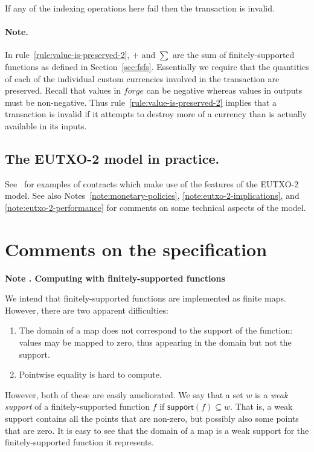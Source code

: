 \documentclass[a4paper]{article}
\newcounter{note}
\newcommand{\note}[1]{
  \bigskip
  \refstepcounter{note}
  \noindent\textbf{Note \thenote. #1}
}
\newcommand{\msf}[1]{\ensuremath{\mathsf{#1}}}
\newcommand{\mi}[1]{\ensuremath{\mathit{#1}}}
\newcommand{\support}{\msf{support}}
\newcommand{\forge}{\mi{forge}}
\begin{document}
\noindent If any of the indexing operations here fail then the
transaction is invalid.

\paragraph{Note.} In rule~\ref{rule:value-is-preserved-2},
$+$ and $\sum$ are the sum of finitely-supported functions as defined in
Section~\ref{sec:fsfs}. Essentially we require that the
quantities of each of the individual custom currencies involved in the
transaction are preserved. Recall that values in $\forge$ can
be negative whereas values in outputs must be non-negative.  Thus
rule~\ref{rule:value-is-preserved-2} implies that a
transaction is invalid if it attempts to destroy more of a currency
than is actually available in its inputs.

\subsection{The EUTXO-2 model in practice.}
See~\cite{Plutus-book} for examples of contracts which make use of the
features of the EUTXO-2 model.  See also
Notes~\ref{note:monetary-policies}, \ref{note:eutxo-2-implications},
and \ref{note:eutxo-2-performance} for comments on some technical
aspects of the model.

\appendix
\section{Comments on the specification}
\label{appendix:comments}

\note{Computing with finitely-supported functions}
\label{note:finitely-supported-functions}

We intend that finitely-supported functions are implemented as finite
maps. However, there are two apparent difficulties:
\begin{enumerate}
  \item The domain of a map does not correspond to the support of the function:
    values may be mapped to zero, thus appearing in the domain but not the support.
  \item Pointwise equality is hard to compute.
\end{enumerate}

However, both of these are easily ameliorated. We say that a set $w$ is a \textit{weak support}
of a finitely-supported function $f$ if $\support(f) \subseteq w$. That is, a
weak support contains all the points that are non-zero, but possibly also some
points that are zero. It is easy to see that the domain of a map is a weak
support for the finitely-supported function it represents.
\end{document}

